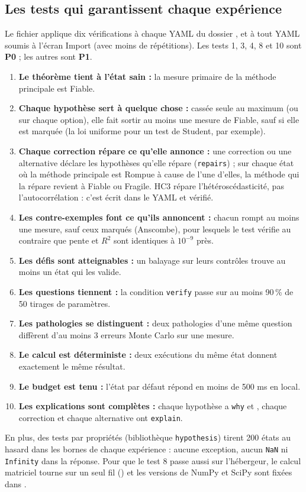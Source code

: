 \documentclass[11pt,a4paper]{article}
\newcommand{\pzero}{\colorbox{ctCorrection!18}{\footnotesize\textbf{P0}}}
\newcommand{\pone}{\colorbox{ctMethod!18}{\footnotesize\textbf{P1}}}
\begin{document}
\subsection{Les tests qui garantissent chaque expérience}\label{sec:tests}
Le fichier  applique dix vérifications à chaque YAML du dossier , et à tout YAML soumis à l'écran Import (avec moins de répétitions). Les tests 1, 3, 4, 8 et 10 sont \pzero{} ; les autres sont \pone{}.
\begin{enumerate}[leftmargin=*, nosep]
  \item \textbf{Le théorème tient à l'état sain :} la mesure primaire de la méthode principale est Fiable.
  \item \textbf{Chaque hypothèse sert à quelque chose :} cassée seule au maximum (ou sur chaque option), elle fait sortir au moins une mesure de Fiable, sauf si elle est marquée  (la loi uniforme pour un test de Student, par exemple).
  \item \textbf{Chaque correction répare ce qu'elle annonce :} une correction ou une alternative déclare les hypothèses qu'elle répare (\texttt{repairs}) ; sur chaque état où la méthode principale est Rompue à cause de l'une d'elles, la méthode qui la répare revient à Fiable ou Fragile. HC3 répare l'hétéroscédasticité, pas l'autocorrélation : c'est écrit dans le YAML et vérifié.
  \item \textbf{Les contre-exemples font ce qu'ils annoncent :} chacun rompt au moins une mesure, sauf ceux marqués  (Anscombe), pour lesquels le test vérifie au contraire que pente et $R^2$ sont identiques à $10^{-9}$ près.
  \item \textbf{Les défis sont atteignables :} un balayage sur leurs contrôles trouve au moins un état qui les valide.
  \item \textbf{Les questions tiennent :} la condition \texttt{verify} passe sur au moins 90\,\% de 50 tirages de paramètres.
  \item \textbf{Les pathologies se distinguent :} deux pathologies d'une même question diffèrent d'au moins 3 erreurs Monte Carlo sur une mesure.
  \item \textbf{Le calcul est déterministe :} deux exécutions du même état donnent exactement le même résultat.
  \item \textbf{Le budget est tenu :} l'état par défaut répond en moins de 500 ms en local.
  \item \textbf{Les explications sont complètes :} chaque hypothèse a \texttt{why} et , chaque correction et chaque alternative ont \texttt{explain}.
\end{enumerate}
En plus, des tests par propriétés (bibliothèque \texttt{hypothesis}) tirent 200 états au hasard dans les bornes de chaque expérience : aucune exception, aucun \texttt{NaN} ni \texttt{Infinity} dans la réponse. Pour que le test 8 passe aussi sur l'hébergeur, le calcul matriciel tourne sur un seul fil () et les versions de NumPy et SciPy sont fixées dans .
\end{document}

